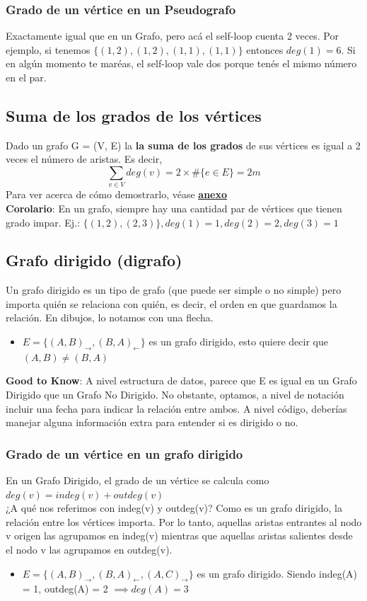 \documentclass[10pt,a4paper]{article}
\begin{document}
\subsubsection*{Grado de un vértice en un Pseudografo}
Exactamente igual que en un Grafo, pero acá el self-loop cuenta 2 veces. Por ejemplo, si tenemos $\{(1,2), (1,2), (1, 1), (1, 1)\}$ entonces $deg(1) = 6$. Si en algún momento te maréas, el self-loop vale dos porque tenés el mismo número en el par.
\subsection*{Suma de los grados de los vértices}
Dado un grafo G = (V, E) la \textbf{la suma de los grados} de sus vértices es igual a 2 veces el número de aristas. Es decir, 
\[\sum_{v \in V} deg(v) = 2 \times \#\{e \in E\} = 2m\] 
Para ver acerca de cómo demostrarlo, véase \hyperref[subsubsec:suma_grados_vertices]{\textbf{anexo}} \\
\textbf{Corolario}: En un grafo, siempre hay una cantidad par de vértices que tienen grado impar. Ej.: $\{(1, 2), (2, 3)\}, deg(1) = 1, deg(2) = 2, deg(3) = 1$
\subsection*{Grafo dirigido (digrafo)}
Un grafo dirigido es un tipo de grafo (que puede ser simple o no simple) pero importa quién se relaciona con quién, es decir, el orden en que guardamos la relación. En dibujos, lo notamos con una flecha. 
\begin{itemize}
    \item $E = \{(A,B)_{\rightarrow}, (B, A)_{\leftarrow} \}$ es un grafo dirigido, esto quiere decir que $(A,B) \neq (B, A)$
\end{itemize}
\textbf{Good to Know}: A nivel estructura de datos, parece que E es igual en un Grafo Dirigido que un Grafo No Dirigido. No obstante, optamos, a nivel de notación incluir una fecha para indicar la relación entre ambos. A nivel código, deberías manejar alguna información extra para entender si es dirigido o no.
\subsubsection*{Grado de un vértice en un grafo dirigido}
En un Grafo Dirigido, el grado de un vértice se calcula como $deg(v) = indeg(v) + outdeg(v)$ \\
¿A qué nos referimos con indeg(v) y outdeg(v)? Como es un grafo dirigido, la relación entre los vértices importa. Por lo tanto, aquellas aristas entrantes al nodo v origen las agrupamos en indeg(v) mientras que aquellas aristas salientes desde el nodo v las agrupamos en outdeg(v).
\begin{itemize}
    \item $E = \{(A,B)_{\rightarrow}, (B, A)_{\leftarrow}, (A, C)_{\rightarrow} \}$ es un grafo dirigido. Siendo indeg(A) = 1, outdeg(A) = 2 $\implies deg(A) = 3$ 
\end{itemize}
\end{document}
